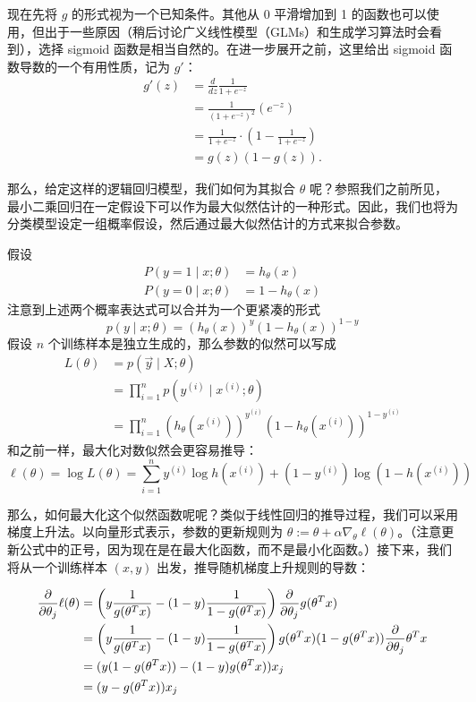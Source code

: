 现在先将 $g$ 的形式视为一个已知条件。其他从 0 平滑增加到 1 的函数也可以使用，但出于一些原因（稍后讨论广义线性模型（GLMs）和生成学习算法时会看到），选择 sigmoid 函数是相当自然的。在进一步展开之前，这里给出 sigmoid 函数导数的一个有用性质，记为 $g'$：
\[
    \begin{aligned}
        g'(z) &= \frac{d}{dz} \frac{1}{1+e^{-z}} \\ 
        &= \frac{1}{(1+e^{-z})^2} (e^{-z}) \\ 
        &= \frac{1}{1+e^{-z}} \cdot \left(1 - \frac{1}{1+e^{-z}}\right) \\ 
        &= g(z)(1 - g(z)).
    \end{aligned}
\]

那么，给定这样的逻辑回归模型，我们如何为其拟合 $\theta$ 呢？参照我们之前所见，最小二乘回归在一定假设下可以作为最大似然估计的一种形式。因此，我们也将为分类模型设定一组概率假设，然后通过最大似然估计的方式来拟合参数。

假设
\[
    \begin{aligned}
        P(y=1 \mid x; \theta) &= h_\theta(x) \\
        P(y=0 \mid x; \theta) &= 1 - h_\theta(x)
    \end{aligned}
\]
注意到上述两个概率表达式可以合并为一个更紧凑的形式
\[
    p(y \mid x; \theta) = (h_\theta(x))^y (1 - h_\theta(x))^{1-y}
\]
假设 $n$ 个训练样本是独立生成的，那么参数的似然可以写成
\[
    \begin{aligned}
        L(\theta) &= p(\vec{y} \mid X; \theta) \\ 
        &= \prod_{i=1}^n p(y^{(i)} \mid x^{(i)}; \theta) \\ 
        &= \prod_{i=1}^n (h_\theta(x^{(i)}))^{y^{(i)}} (1 - h_\theta(x^{(i)}))^{1-y^{(i)}}
    \end{aligned}
\]
和之前一样，最大化对数似然会更容易推导：
\begin{equation}
    \ell(\theta) = \log L(\theta) = \sum_{i=1}^n y^{(i)} \log h(x^{(i)}) + (1 - y^{(i)}) \log(1 - h(x^{(i)}))
    \label{eq:logistic_log_likelihood}
\end{equation}

那么，如何最大化这个似然函数呢呢？类似于线性回归的推导过程，我们可以采用梯度上升法。以向量形式表示，参数的更新规则为 $\theta := \theta + \alpha \nabla_\theta \ell(\theta)$。（注意更新公式中的正号，因为现在是在最大化函数，而不是最小化函数。）接下来，我们将从一个训练样本 $(x, y)$ 出发，推导随机梯度上升规则的导数：

\begin{align}
    \frac{\partial}{\partial \theta_j} \ell(\theta) &= \left(y \frac{1}{g(\theta^T x)} - (1-y) \frac{1}{1-g(\theta^T x)}\right) \frac{\partial}{\partial \theta_j} g(\theta^T x) \notag\\ 
    &= \left(y \frac{1}{g(\theta^T x)} - (1-y) \frac{1}{1-g(\theta^T x)}\right) g(\theta^T x)(1-g(\theta^T x)) \frac{\partial}{\partial \theta_j} \theta^T x \notag\\ 
    &= (y(1-g(\theta^T x)) - (1-y)g(\theta^T x)) x_j \notag\\
    &= (y - g(\theta^T x)) x_j \label{eq:partial_loss_theta}
\end{align}

